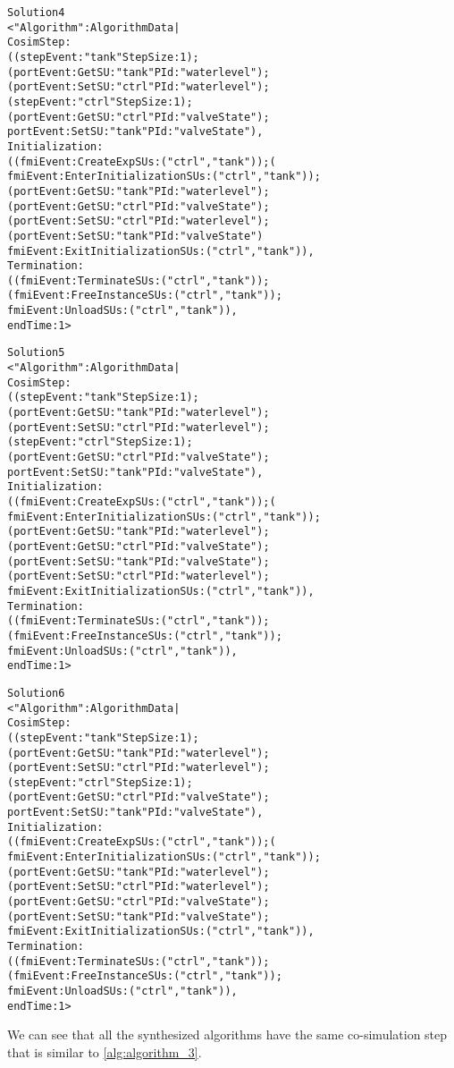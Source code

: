 \begin{example}
\begin{alltt}
Solution 4
{< "Algorithm" : AlgorithmData | 
CosimStep :
  ((stepEvent: "tank" StepSize: 1);
  (portEvent: Get SU: "tank" PId: "waterlevel");
  (portEvent: Set SU: "ctrl" PId: "waterlevel");
  (stepEvent: "ctrl" StepSize: 1);
  (portEvent: Get SU: "ctrl" PId: "valveState");
  portEvent: Set SU: "tank" PId: "valveState"),
Initialization :
  ((fmiEvent: CreateExp SUs:("ctrl", "tank"));(
  fmiEvent: EnterInitialization SUs:("ctrl", "tank"));
    (portEvent: Get SU: "tank" PId: "waterlevel");
    (portEvent: Get SU: "ctrl" PId: "valveState");
    (portEvent: Set SU: "ctrl" PId: "waterlevel");
    (portEvent: Set SU: "tank" PId: "valveState")
  fmiEvent: ExitInitialization SUs:("ctrl", "tank")),
Termination :
  ((fmiEvent: Terminate SUs:("ctrl", "tank"));
  (fmiEvent: FreeInstance SUs:("ctrl", "tank"));
  fmiEvent: Unload SUs:("ctrl", "tank")),
endTime : 1 >}

Solution 5
{< "Algorithm" : AlgorithmData | 
CosimStep :
  ((stepEvent: "tank" StepSize: 1);
  (portEvent: Get SU: "tank" PId: "waterlevel");
  (portEvent: Set SU: "ctrl" PId: "waterlevel");
  (stepEvent: "ctrl" StepSize: 1);
  (portEvent: Get SU: "ctrl" PId: "valveState");
  portEvent: Set SU: "tank" PId: "valveState"),
Initialization :
  ((fmiEvent: CreateExp SUs:("ctrl", "tank"));(
  fmiEvent: EnterInitialization SUs:("ctrl", "tank"));
    (portEvent: Get SU: "tank" PId: "waterlevel");
    (portEvent: Get SU: "ctrl" PId: "valveState");
    (portEvent: Set SU: "tank" PId: "valveState");
    (portEvent: Set SU: "ctrl" PId: "waterlevel");
  fmiEvent: ExitInitialization SUs:("ctrl", "tank")),
Termination :
  ((fmiEvent: Terminate SUs:("ctrl", "tank"));
  (fmiEvent: FreeInstance SUs:("ctrl", "tank"));
  fmiEvent: Unload SUs:("ctrl", "tank")),
endTime : 1 >}

Solution 6
{< "Algorithm" : AlgorithmData | 
CosimStep :
  ((stepEvent: "tank" StepSize: 1);
  (portEvent: Get SU: "tank" PId: "waterlevel");
  (portEvent: Set SU: "ctrl" PId: "waterlevel");
  (stepEvent: "ctrl" StepSize: 1);
  (portEvent: Get SU: "ctrl" PId: "valveState");
  portEvent: Set SU: "tank" PId: "valveState"),
Initialization :
  ((fmiEvent: CreateExp SUs:("ctrl", "tank"));(
  fmiEvent: EnterInitialization SUs:("ctrl", "tank"));
  (portEvent: Get SU: "tank" PId: "waterlevel");
  (portEvent: Set SU: "ctrl" PId: "waterlevel");
  (portEvent: Get SU: "ctrl" PId: "valveState");
  (portEvent: Set SU: "tank" PId: "valveState");
  fmiEvent: ExitInitialization SUs:("ctrl", "tank")),
Termination :
  ((fmiEvent: Terminate SUs:("ctrl", "tank"));
  (fmiEvent: FreeInstance SUs:("ctrl", "tank"));
  fmiEvent: Unload SUs:("ctrl", "tank")),
endTime : 1 >}
\end{alltt}
\normalsize
We can see that all the synthesized algorithms have the same co-simulation step that is similar to \cref{alg:algorithm_3}.
\end{example}

